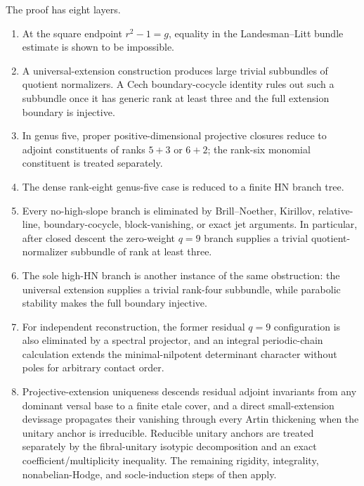 \documentclass[11pt]{article}
\theoremstyle{definition}
\begin{document}
The proof has eight layers.
\begin{enumerate}[label=\textup{(\arabic*)}]
\item At the square endpoint $r^2-1=g$, equality in the
Landesman--Litt bundle estimate is shown to be impossible.
\item A universal-extension construction produces large trivial subbundles
of quotient normalizers.  A Cech boundary-cocycle identity rules out such a
subbundle once it has generic rank at least three and the full extension
boundary is injective.
\item In genus five, proper positive-dimensional projective closures reduce
to adjoint constituents of ranks $5+3$ or $6+2$; the rank-six monomial
constituent is treated separately.
\item The dense rank-eight genus-five case is reduced to a finite HN branch
tree.
\item Every no-high-slope branch is eliminated by Brill--Noether, Kirillov,
relative-line, boundary-cocycle, block-vanishing, or exact jet arguments.
In particular, after closed descent the zero-weight $q=9$ branch supplies a
trivial quotient-normalizer subbundle of rank at least three.
\item The sole high-HN branch is another instance of the same obstruction:
the universal extension supplies a trivial rank-four subbundle, while
parabolic stability makes the full boundary injective.
\item For independent reconstruction, the former residual $q=9$
configuration is also eliminated by a spectral projector, and an integral
periodic-chain calculation extends the minimal-nilpotent determinant
character without poles for arbitrary contact order.
\item Projective-extension uniqueness descends residual adjoint invariants
from any dominant versal base to a finite etale cover, and a direct
small-extension devissage propagates their vanishing through every Artin
thickening when the unitary anchor is irreducible.  Reducible unitary anchors
are treated separately by the fibral-unitary isotypic decomposition and an
exact coefficient/multiplicity inequality.  The remaining rigidity,
integrality, nonabelian-Hodge, and socle-induction steps of \cite{LLCan} then
apply.
\end{enumerate}
\end{document}
